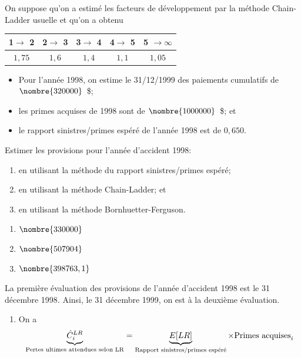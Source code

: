 \begin{exercice}
  On suppose qu'on a estimé les facteurs de développement par la
  méthode Chain-Ladder usuelle et qu'on a obtenu
  \begin{center}
    \begin{tabular}{|c c c c c|}\hline
      1$\rightarrow$ 2 &  2$\rightarrow$ 3 &  3$\rightarrow$ 4 &  4$\rightarrow$ 5  &5 $\rightarrow  \infty$  \\ \hline
      $1,75$ & $1,6$ & $1,4$ & $1,1$ & $1,05$ \\ \hline
    \end{tabular}
  \end{center}
  \begin{itemize}
  \item Pour l'année 1998, on estime le 31/12/1999 des paiements
    cumulatifs de $\nombre{320000}$~\$;
  \item les primes acquises de 1998 sont de $\nombre{1000000}$~\$; et
  \item le rapport sinistres/primes espéré de l'année 1998 est de
    $0,650$.
  \end{itemize}
  Estimer les provisions pour l'année d'accident 1998:
  \begin{enumerate}
  \item en utilisant la méthode du rapport sinistres/primes espéré;
  \item en utilisant la méthode Chain-Ladder; et
  \item en utilisant la méthode Bornhuetter-Ferguson.
  \end{enumerate}
  \begin{rep}
    \begin{enumerate}
    \item $\nombre{330000}$
    \item $\nombre{507904}$
    \item $\nombre{398763,1}$
    \end{enumerate}
  \end{rep}
  \begin{sol}
    La première évaluation des provisions de l'année d'accident 1998 est
    le 31 décembre 1998. Ainsi, le 31 décembre 1999, on est à la
    deuxième évaluation.
    \begin{enumerate}
    \item On a
      \begin{align*}
        \underbrace{\hat{C}_{i}^{LR}}_{\text{Pertes ultimes attendues selon LR}} &=
                                                                                   \underbrace{\Esp{LR}}_{\text{Rapport sinistres/primes espéré}} \times \text{Primes acquises}_i\\

\end{align*}
\end{enumerate}
\end{sol}
\end{exercice}
